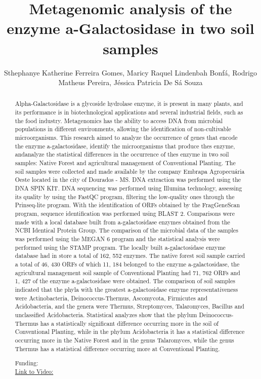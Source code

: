 \documentclass[twoside]{article}
\title{\vspace{-15mm}\fontsize{24pt}{10pt}\selectfont\textbf{ Metagenomic analysis of the enzyme a-Galactosidase in two soil samples }} %
\author{ Sthephanye Katherine Ferreira Gomes,  Maricy Raquel Lindenbah Bonf\'a,  Rodrigo Matheus Pereira,  J\'essica Patricia De S\'a Souza }
\affil{ FUNDA\c{C}\~AO UNIVERSIDADE FEDERAL DA GRANDE DOURADOS,  UFGD - UNIVERSIDADE FEDERAL DA GRANDE DOURADOS }
\date{}
\begin{document}
  
  
  \maketitle %
  
  
  \thispagestyle{fancy} %
  
  
  \begin{abstract}
  Alpha-Galactosidase is a glycoside hydrolase enzyme,  it is present in many plants,  and its performance is in biotechnological applications and several industrial fields,  such as the food industry. Metagenomics has the ability to access DNA from microbial populations in different environments,  allowing the identification of non-cultivable microorganisms. This research aimed to analyze the occurrence of genes that encode the enzyme a-galactosidase,  identify the microorganisms that produce thes enzyme,  andanalyze the statistical differences in the occurrence of thes enzyme in two soil samples: Native Forest and agricultural management of Conventional Planting. The soil samples were collected and made available by the company Embrapa Agropecu\'aria Oeste located in the city of Dourados - MS. DNA extraction was performed using the DNA SPIN KIT. DNA sequencing was performed using Illumina technology,  assessing its quality by using the FastQC program,  filtering the low-quality ones through the Prinseq-lite program. With the identification of ORFs obtained by the FragGeneScan program,  sequence identification was performed using BLAST 2. Comparisons were made with a local database built from a-galactosidase enzymes obtained from the NCBI Identical Protein Group. The comparison of the microbial data of the samples was performed using the MEGAN 6 program and the statistical analysis were performed using the STAMP program. The locally built a-galactosidase enzyme database had in store a total of 162, 552 enzymes. The native forest soil sample carried a total of 46, 430 ORFs of which 11, 184 belonged to the enzyme a-galactosidase,  the agricultural management soil sample of Conventional Planting had 71, 762 ORFs and 1, 427 of the enzyme a-galactosidase were obtained. The comparison of soil samples indicated that the phyla with the greatest a-galactosidase enzyme representativeness were Actinobacteria,  Deinococcus-Thermus,  Ascomycota,  Firmicutes and Acidobacteria,  and the genera were Thermus,  Streptomyces,  Talaromyces,  Bacillus and unclassified Acidobacteria. Statistical analyzes show that the phylum Deinococcus-Thermus has a statistically significant difference occurring more in the soil of Conventional Planting,  while in the phylum Acidobacteria it has a statistical difference occurring more in the Native Forest and in the genus Talaromyces,  while the genus Thermus has a statistical difference occurring more at Conventional Planting.
  
  Funding:   \\
  \href{http://ab3c.org.br/xpress_pres2020/xmxp2020-303040.html}{Link to Video:}

  \end{abstract}
   
  
\end{document}

